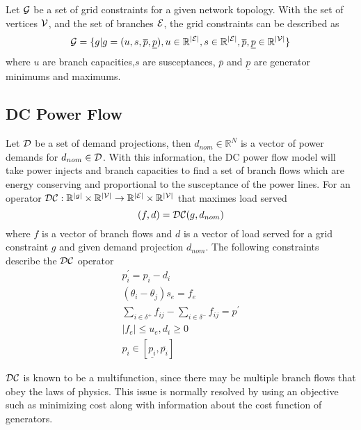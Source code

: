 Let $\mathcal{G}$ be a set of grid constraints for a given network topology.  With the set of vertices $\mathcal{V}$, and the set of branches $\mathcal{E}$, the grid constraints can be described as 
\begin{equation}\label{gt}
 \mathcal{G} = \{ g | g = (u, s,\overline p,\underline p ),
		  u \in \mathbb{R}^{ \left| \mathcal{E} \right| },
		  s \in \mathbb{R}^{ \left| \mathcal{E} \right| },
		 \overline p ,\underline p  \in \mathbb{R}^{ \left| \mathcal{V} \right| } 
	\}
\end{equation}
where $u$ are branch capacities,$s$ are susceptances, $\overline p$ and $\underline p$ are generator minimums and maximums. \\

\subsection{DC Power Flow}
Let $\mathcal{D}$ be a set of demand projections, then $d_{nom}\in \mathbb{R}^{N}$ is a vector of power demands for $d_{nom} \in \mathcal{D}$.  With this information, the DC power flow model will take power injects and branch capacities to find a set of branch flows which are energy conserving and proportional to the susceptance of the power lines. For an operator $\mathcal{DC} : \mathbb{R}^{\left| g \right| } \times \mathbb{R}^{\left| \mathcal{V} \right|} \rightarrow \mathbb{R}^{\left| \mathcal{E} \right|} \times \mathbb{R}^{\left| \mathcal{V} \right|} $ that maximes load served
\begin{equation}\label{dc}
( f, d ) = \mathcal{DC} ( g , d_{nom} )
\end{equation}
where $f$ is a vector of branch flows and $d$ is a vector of load served for a grid constraint $g$ and given demand projection $d_{nom}$.  The following constraints describe the $\mathcal{DC}$ operator
\begin{align}
	p_i^\prime = p_i - d_i \\
	(\theta_i - \theta_j ) s_e = f_e \\
	\sum_{ i \in \delta^+ } f_{ij} - \sum_{ i \in \delta^- } f_{ij} = p^\prime \\
 	\left| f_e \right| \le u_e, 	d_i \ge 0 \\
	p_i \in \left[ \underline{p_i} , \overline{p_i} \right]
\end{align}

$\mathcal{DC}$ is known to be a multifunction, since there may be multiple branch flows that obey the laws of physics.  This issue is normally resolved by using an objective such as minimizing cost along with information about the cost function of generators.  

